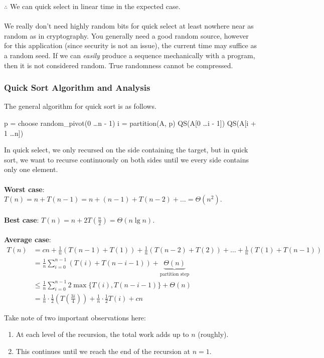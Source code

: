 \documentclass[]{article}
\theoremstyle{definition}
\begin{document}
				$\therefore$ We can quick select in linear time in the expected case.
				\\ \\
				We really don't need highly random bits for quick select \textendash{} at least nowhere near as random as in cryptography. You generally need a good random source, however for this application (since security is not an issue), the current time may suffice as a random seed. If we can \emph{easily} produce a sequence mechanically with a program, then it is not considered random. True randomness cannot be compressed.
			\subsubsection{Quick Sort Algorithm and Analysis}
				The general algorithm for quick sort is as follows. \\
				\begin{algorithm}[H]
					p = choose random\_pivot(0 \ldots n - 1)\;
					i = partition(A, p)\;
					QS(A[0 \ldots i - 1])\;
					QS(A[i + 1 \ldots n])\;
				\end{algorithm}

				In quick select, we only recursed on the side containing the target, but in quick sort, we want to recurse continuously on both sides until we every side contains only one element.
				\\ \\
				\textbf{Worst case}: $T(n) = n + T(n - 1) = n + (n - 1) + T(n - 2) + \ldots = \Theta(n^2)$.
				\\ \\
				\textbf{Best case}: $T(n) = n + 2T\left(\frac{n}{2}\right) = \Theta(n \lg n)$.
				\\ \\
				\textbf{Average case}:
				\begin{align*}
					T(n) &= cn + \frac{1}{n}(T(n - 1) + T(1)) + \frac{1}{n}(T(n - 2) + T(2)) + \ldots + \frac{1}{n}(T(1) + T(n - 1)) \\
					&= \frac{1}{n} \sum_{i = 0}^{n - 1}(T(i) + T(n - i - 1)) + \underbrace{\Theta(n)}_{\text{partition step}} \\
					&\le \frac{1}{n} \sum_{i = 0}^{n - 1} 2 \max \{T(i), T(n - i - 1) \} + \Theta(n) \\
					&= \frac{1}{n} \cdot \frac{1}{2}(T\left(\frac{3i}{4}\right)) + \frac{1}{n} \cdot \frac{1}{2} T(i) + cn
				\end{align*}

				Take note of two important observations here:
				\begin{enumerate}
					\item At each level of the recursion, the total work adds up to $n$ (roughly).
					\item This continues until we reach the end of the recursion at $n = 1$.
				\end{enumerate}
\end{document}
